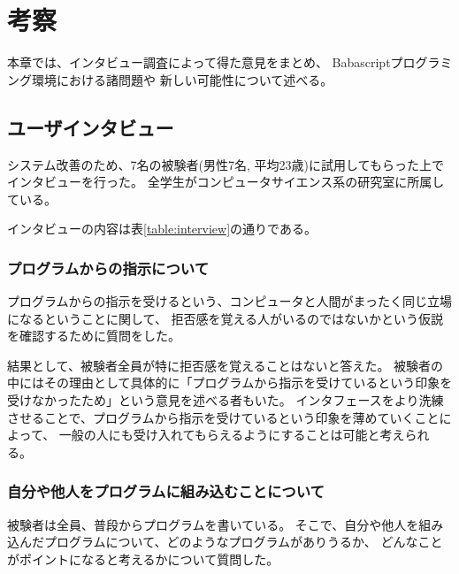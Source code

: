 \chapter{考察}\label{chap:discussion}

本章では、インタビュー調査によって得た意見をまとめ、
Babascriptプログラミング環境における諸問題や
新しい可能性について述べる。

\newpage

\section{ユーザインタビュー}\label{ux30e6ux30fcux30b6ux30a4ux30f3ux30bfux30d3ux30e5ux30fc}

システム改善のため、7名の被験者(男性7名,
平均23歳)に試用してもらった上でインタビューを行った。
全学生がコンピュータサイエンス系の研究室に所属している。

インタビューの内容は表\ref{table:interview}の通りである。

\subsection{プログラムからの指示について}\label{ux30d7ux30edux30b0ux30e9ux30e0ux304bux3089ux306eux6307ux793aux306bux3064ux3044ux3066}

プログラムからの指示を受けるという、コンピュータと人間がまったく同じ立場になるということに関して、
拒否感を覚える人がいるのではないかという仮説を確認するために質問をした。

結果として、被験者全員が特に拒否感を覚えることはないと答えた。
被験者の中にはその理由として具体的に「プログラムから指示を受けているという印象を受けなかったため」という意見を述べる者もいた。
インタフェースをより洗練させることで、プログラムから指示を受けているという印象を薄めていくことによって、
一般の人にも受け入れてもらえるようにすることは可能と考えられる。

\subsection{自分や他人をプログラムに組み込むことについて}\label{ux81eaux5206ux3084ux4ed6ux4ebaux3092ux30d7ux30edux30b0ux30e9ux30e0ux306bux7d44ux307fux8fbcux3080ux3053ux3068ux306bux3064ux3044ux3066}

被験者は全員、普段からプログラムを書いている。
そこで、自分や他人を組み込んだプログラムについて、どのようなプログラムがありうるか、
どんなことがポイントになると考えるかについて質問した。

